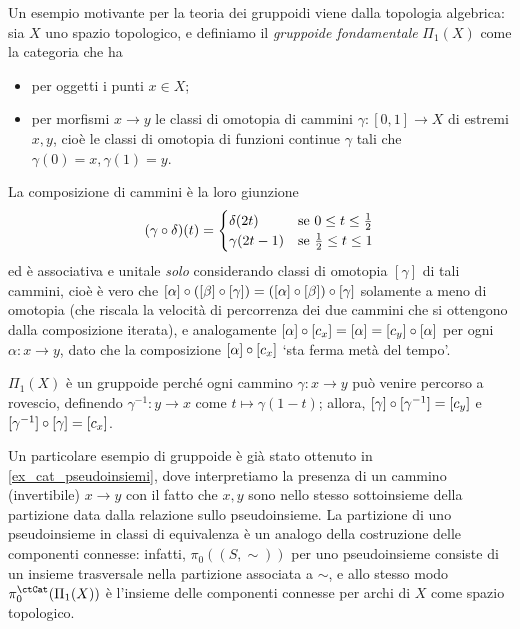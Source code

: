 \begin{definition}\label{es_gruppoide_fondamentale}
	Un esempio motivante per la teoria dei gruppoidi viene dalla topologia algebrica: sia \(X\) uno spazio topologico, e definiamo il \emph{gruppoide fondamentale} \(\Pi_1(X)\) come la categoria che ha
	\begin{itemize}
		\item per oggetti i punti \(x\in X\);
		\item per morfismi \(x\to y\) le classi di omotopia di cammini \(\gamma : [0,1] \to X\) di estremi \(x,y\), cioè le classi di omotopia di funzioni continue \(\gamma\) tali che \(\gamma(0)=x, \gamma(1)=y\).
	\end{itemize}
	La composizione di cammini è la loro giunzione
	\[
		(\gamma\circ \delta)(t) =
		\begin{cases}
			\delta(2t)   & \text{se } 0\le t\le \frac 12  \\
			\gamma(2t-1) & \text{se } \frac 12 \le t\le 1 \\
		\end{cases}\]
	ed è associativa e unitale \emph{solo} considerando classi di omotopia \([\gamma]\) di tali cammini, cioè è vero che \([\alpha] \circ \left([\beta] \circ [\gamma]\right) = \left([\alpha] \circ [\beta]\right) \circ [\gamma]\) solamente a meno di omotopia (che riscala la velocità di percorrenza dei due cammini che si ottengono dalla composizione iterata), e analogamente \([\alpha]\circ [c_x] = [\alpha] = [c_y]\circ [\alpha]\) per ogni \(\alpha : x\to y\), dato che la composizione \([\alpha]\circ [c_x]\) `sta ferma metà del tempo'.

	\(\Pi_1(X)\) è un gruppoide perché ogni cammino \(\gamma : x\to y\) può venire percorso a rovescio, definendo \(\gamma^{-1} : y\to x\) come \(t\mapsto\gamma(1-t)\); allora, \([\gamma]\circ[\gamma^{-1}] = [c_y]\) e \([\gamma^{-1}]\circ [\gamma] = [c_x]\).
\end{definition}
Un particolare esempio di gruppoide è già stato ottenuto in \ref{ex_cat_pseudoinsiemi}, dove interpretiamo la presenza di un cammino (invertibile) \(x\to y\) con il fatto che \(x,y\) sono nello stesso sottoinsieme della partizione data dalla relazione sullo pseudoinsieme. La partizione di uno pseudoinsieme in classi di equivalenza è un analogo della costruzione delle componenti connesse: infatti, \(\pi_0((S,\sim))\) per uno pseudoinsieme consiste di un insieme trasversale nella partizione associata a \(\sim\), e allo stesso modo \(\pi_0^\ctCat(\Pi_1(X))\) è l'insieme delle componenti connesse per archi di \(X\) come spazio topologico.

